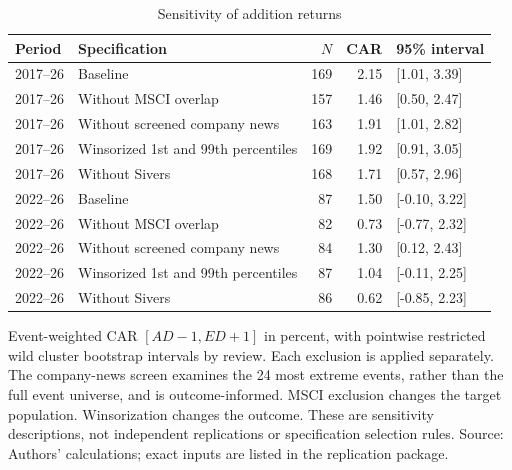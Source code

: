 \begin{table}[!htbp]
\centering
\caption{Sensitivity of addition returns}\label{tab:robustness}
\small
\setlength{\tabcolsep}{5pt}
\begin{tabular}{llrrl}
\toprule
Period & Specification & $N$ & CAR & 95\% interval \\
\midrule
2017--26 & Baseline & 169 & 2.15 & [1.01, 3.39] \\
2017--26 & Without MSCI overlap & 157 & 1.46 & [0.50, 2.47] \\
2017--26 & Without screened company news & 163 & 1.91 & [1.01, 2.82] \\
2017--26 & Winsorized 1st and 99th percentiles & 169 & 1.92 & [0.91, 3.05] \\
2017--26 & Without Sivers & 168 & 1.71 & [0.57, 2.96] \\
2022--26 & Baseline & 87 & 1.50 & [-0.10, 3.22] \\
2022--26 & Without MSCI overlap & 82 & 0.73 & [-0.77, 2.32] \\
2022--26 & Without screened company news & 84 & 1.30 & [0.12, 2.43] \\
2022--26 & Winsorized 1st and 99th percentiles & 87 & 1.04 & [-0.11, 2.25] \\
2022--26 & Without Sivers & 86 & 0.62 & [-0.85, 2.23] \\
\bottomrule
\end{tabular}
\begin{minipage}{\linewidth}\footnotesize\vspace{5pt}
Event-weighted CAR $[AD-1,ED+1]$ in percent, with pointwise restricted wild cluster bootstrap intervals by review. Each exclusion is applied separately. The company-news screen examines the 24 most extreme events, rather than the full event universe, and is outcome-informed. MSCI exclusion changes the target population. Winsorization changes the outcome. These are sensitivity descriptions, not independent replications or specification selection rules. Source: Authors' calculations; exact inputs are listed in the replication package.
\end{minipage}
\end{table}
